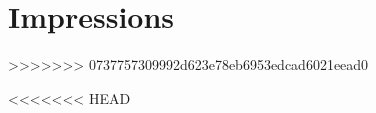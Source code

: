\documentclass[12pt,a4paper]{article}
\newcommand{\AI}{Intelligence Artificielle}
\begin{document}
  \section{\large \bfseries Impressions} %
>>>>>>> 0737757309992d623e78eb6953edcad6021eead0


<<<<<<< HEAD
\end{document}
